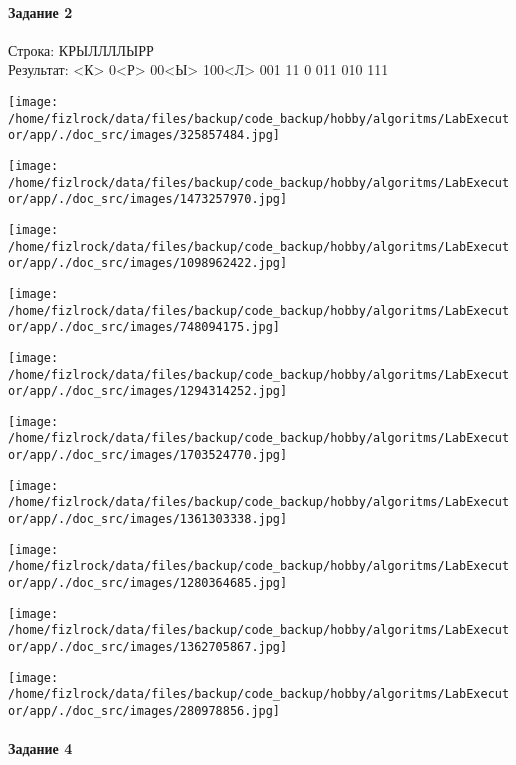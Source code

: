 \documentclass[a4paper, 12pt]{article}
\begin{document}
\paragraph{Задание 2}

Строка: 
КРЫЛЛЛЛЫРР\\
Результат: <К> 0<Р> 00<Ы> 100<Л> 001 11 0 011 010 111

\texttt{[image: /home/fizlrock/data/files/backup/code\_backup/hobby/algoritms/LabExecutor/app/./doc\_src/images/325857484.jpg]}

\texttt{[image: /home/fizlrock/data/files/backup/code\_backup/hobby/algoritms/LabExecutor/app/./doc\_src/images/1473257970.jpg]}

\texttt{[image: /home/fizlrock/data/files/backup/code\_backup/hobby/algoritms/LabExecutor/app/./doc\_src/images/1098962422.jpg]}

\texttt{[image: /home/fizlrock/data/files/backup/code\_backup/hobby/algoritms/LabExecutor/app/./doc\_src/images/748094175.jpg]}

\texttt{[image: /home/fizlrock/data/files/backup/code\_backup/hobby/algoritms/LabExecutor/app/./doc\_src/images/1294314252.jpg]}

\texttt{[image: /home/fizlrock/data/files/backup/code\_backup/hobby/algoritms/LabExecutor/app/./doc\_src/images/1703524770.jpg]}

\texttt{[image: /home/fizlrock/data/files/backup/code\_backup/hobby/algoritms/LabExecutor/app/./doc\_src/images/1361303338.jpg]}

\texttt{[image: /home/fizlrock/data/files/backup/code\_backup/hobby/algoritms/LabExecutor/app/./doc\_src/images/1280364685.jpg]}

\texttt{[image: /home/fizlrock/data/files/backup/code\_backup/hobby/algoritms/LabExecutor/app/./doc\_src/images/1362705867.jpg]}

\texttt{[image: /home/fizlrock/data/files/backup/code\_backup/hobby/algoritms/LabExecutor/app/./doc\_src/images/280978856.jpg]}
\pagebreak
\paragraph{Задание 4}
\end{document}
